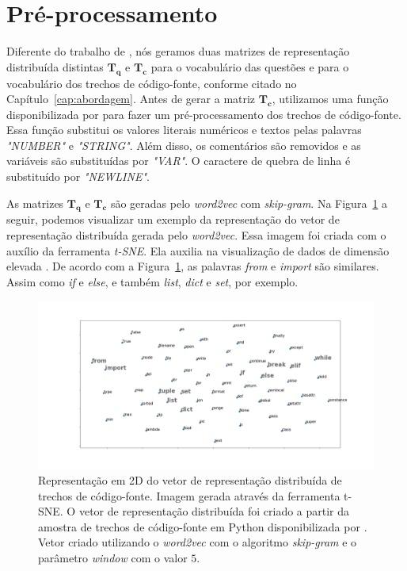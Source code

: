 \section{Pré-processamento}
\label{sec:pre-processamento}

Diferente do trabalho de \cite{tan-lstm-qa}, nós geramos duas matrizes de representação distribuída distintas $\bm{T_{q}}$ e $\bm{T_{c}}$ para o vocabulário das questões e para o vocabulário dos trechos de código-fonte, conforme citado no Capítulo~\ref{cap:abordagem}. Antes de gerar a matriz $\bm{T_{c}}$, utilizamos uma função disponibilizada por \cite{yao-2018} para fazer um pré-processamento dos trechos de código-fonte. Essa função substitui os valores literais numéricos e textos pelas palavras \emph{"NUMBER"} e \emph{"STRING"}. Além disso, os comentários são removidos e as variáveis são substituídas por \emph{"VAR"}. O caractere de quebra de linha é substituído por \emph{"NEWLINE"}.

As matrizes $\bm{T_{q}}$ e $\bm{T_{c}}$ são geradas pelo \textit{word2vec} com \textit{skip-gram}. Na Figura~\ref{fig:tsne-code-snippet-python} a seguir, podemos visualizar um exemplo da representação do vetor de representação distribuída gerada pelo \textit{word2vec}. Essa imagem foi criada com o auxílio da ferramenta \textit{t-SNE}. Ela auxilia na visualização de dados de dimensão elevada \citep{scikit-learn-tsne-2019, quora-tsne-2019}. De acordo com a Figura~\ref{fig:tsne-code-snippet-python}, as palavras \emph{from} e \emph{import} são similares. Assim como \emph{if} e \emph{else}, e também \emph{list}, \emph{dict} e \emph{set}, por exemplo.

\begin{figure}[h]
\includegraphics[width=1\textwidth]{figuras/cap-resultados-preliminares/code-tsne-output.png}
\caption{Representação em 2D do vetor de representação distribuída de trechos de código-fonte. Imagem gerada através da ferramenta t-SNE. O vetor de representação distribuída foi criado a partir da amostra de trechos de código-fonte em Python disponibilizada por \cite{yao-2018}. Vetor criado utilizando o \textit{word2vec} com o algoritmo \textit{skip-gram} e o parâmetro \textit{window} com o valor $5$.}
\label{fig:tsne-code-snippet-python}
\end{figure}

